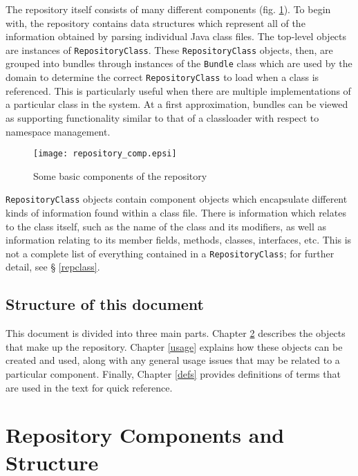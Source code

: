 \documentclass{report}
\begin{document}
The repository itself consists of many different components 
(fig. \ref{repos_graphic}). To begin with,
the repository contains data structures which represent all of the information 
obtained by parsing individual Java class files. The top-level objects are 
instances of \texttt{Re\-pos\-i\-tory\-Class}. These 
\texttt{Re\-pos\-i\-tory\-Class} objects, then, are grouped into bundles
through instances of the \texttt{Bundle} class which are used by the domain to
determine the correct \texttt{Re\-pos\-i\-tory\-Class} to load when a class is 
referenced. This is particularly useful when there are multiple 
implementations of a particular class in the system. At a first approximation,
bundles can be viewed as supporting functionality similar to that of a 
classloader with respect to namespace management.

\begin{figure}[htb]
\begin{center}
\texttt{[image: repository\_comp.epsi]}
\caption{Some basic components of the repository}
\label{repos_graphic}
\end{center}
\end{figure}

\texttt{RepositoryClass} objects contain component objects which encapsulate
different kinds of information found within a class file. There is information
which relates to the class itself, such as the name of the class and its
modifiers, as well as information relating to its member fields, methods,
classes, interfaces, etc. This is not a complete list of everything contained
in a \texttt{Re\-pos\-i\-tory\-Class}; for further detail, see \S 
\ref{repclass}.

\section{Structure of this document}
This document is divided into three main parts. Chapter \ref{components}
describes the objects that make up the repository. Chapter \ref{usage} 
explains how these objects can be created and used, along with any general
usage issues that may be related to a particular component. Finally, Chapter 
\ref{defs} provides definitions of terms that are used in the text for
quick reference.

\chapter{Repository Components and Structure}\label{components}
\end{document}
